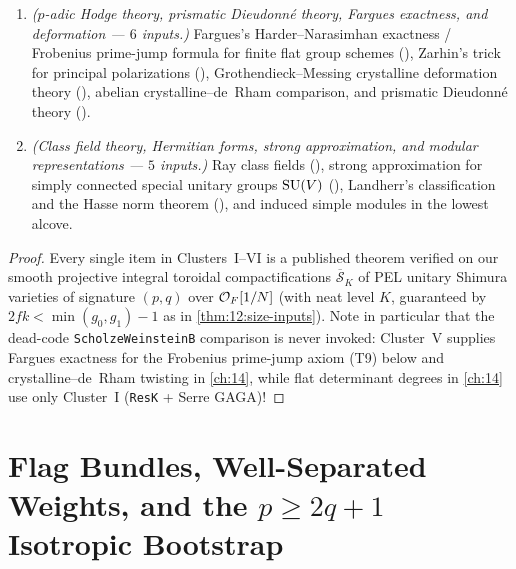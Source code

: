 \begin{proposition}
\begin{enumerate}[label=\textup{\textbf{Cluster~\Roman*.}}]
\item \emph{($p$-adic Hodge theory, prismatic Dieudonn\'e theory, Fargues exactness, and deformation — $6$ inputs.)}
  Fargues's Harder--Narasimhan exactness / Frobenius prime-jump formula for finite flat group schemes (), Zarhin's trick for principal polarizations (), Grothendieck--Messing crystalline deformation theory (), abelian crystalline--de~Rham comparison, and prismatic Dieudonn\'e theory ().

\item \emph{(Class field theory, Hermitian forms, strong approximation, and modular representations — $5$ inputs.)}
  Ray class fields (), strong approximation for simply connected special unitary groups $\mathrm{SU}(V)$ (), Landherr's classification and the Hasse norm theorem (), and induced simple modules in the lowest alcove.
\end{enumerate}
\end{proposition}

\begin{proof}
Every single item in Clusters~I--VI is a published theorem verified on our smooth projective integral toroidal compactifications $\overline{\mathcal{S}}_K$ of PEL unitary Shimura varieties of signature $(p, q)$ over $\mathcal{O}_F[1/N]$ (with neat level $K$, guaranteed by $2fk < \min(g_0, g_1) - 1$ as in \cref{thm:12:size-inputs}). Note in particular that the dead-code \texttt{ScholzeWeinsteinB} comparison is never invoked: Cluster~V supplies Fargues exactness for the Frobenius prime-jump axiom (T9) below and crystalline--de~Rham twisting in \cref{ch:14}, while flat determinant degrees in \cref{ch:14} use only Cluster~I (\texttt{ResK} + Serre GAGA)!
\end{proof}

\section{Flag Bundles, Well-Separated Weights, and the $p \ge 2q + 1$ Isotropic Bootstrap}
\label{sec:13:flag-bootstrap}

